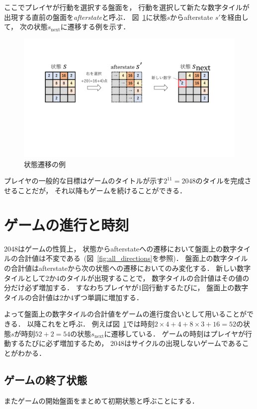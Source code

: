 ここでプレイヤが行動を選択する盤面を， 行動を選択して新たな数字タイルが出現する直前の盤面を\textit{afterstate}と呼ぶ．
図~\ref{fig:transition}に状態$s$からafterstate $s'$を経由して， 次の状態$s_{\text{next}}$に遷移する例を示す．

\begin{figure}[t]
    \centering
    \includegraphics[width=\linewidth{}]{figures/transition_.pdf}
    \caption{状態遷移の例 \label{fig:transition}}
\end{figure}

プレイヤの一般的な目標はゲームのタイトルが示す$2^{11}=2048$のタイルを完成させることだが， それ以降もゲームを続けることができる．

\section{ゲームの進行と時刻}
\label{sec:property}
2048はゲームの性質上， 状態からafterstateへの遷移において盤面上の数字タイルの合計値は不変である~(図~\ref{fig:all_directions}を参照)．
盤面上の数字タイルの合計値はafterstateから次の状態への遷移においてのみ変化する．
新しい数字タイルとして$2$か$4$のタイルが出現することで， 数字タイルの合計値はその値の分だけ必ず増加する．
すなわちプレイヤが$1$回行動するたびに， 盤面上の数字タイルの合計値は$2$か$4$ずつ単調に増加する．

よって盤面上の数字タイルの合計値をゲームの進行度合いとして用いることができる．
以降これをと呼ぶ．
例えば図~\ref{fig:transition}では時刻$2\times4+4+8\times3+16=52$の状態$s$が時刻$52+2=54$の状態$s_{\text{next}}$に遷移している．
ゲームの時刻はプレイヤが行動するたびに必ず増加するため， 2048はサイクルの出現しないゲームであることがわかる．



\subsection{ゲームの終了状態}

またゲームの開始盤面をまとめて初期状態と呼ぶことにする．